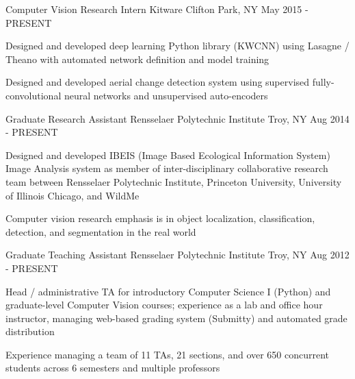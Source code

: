 

\begin{cventries}

  \cventry
    {Computer Vision Research Intern} %
    {Kitware} %
    {Clifton Park, NY} %
    {May 2015 - PRESENT} %
    {
      \begin{cvitems} %
        \item {Designed and developed deep learning Python library (KWCNN) using Lasagne / Theano with automated network definition and model training}
        \item {Designed and developed aerial change detection system using supervised fully-convolutional neural networks and unsupervised auto-encoders}
      \end{cvitems}
    }

\ifresume
\else
    \cventry
      {Graduate Research Assistant} %
      {Rensselaer Polytechnic Institute} %
      {Troy, NY} %
      {Aug 2014 - PRESENT} %
      {
        \begin{cvitems} %
          \item {Designed and developed IBEIS (Image Based Ecological Information System) Image Analysis system as member of inter-disciplinary collaborative research team between Rensselaer Polytechnic Institute, Princeton University, University of Illinois Chicago, and WildMe}
          \item {Computer vision research emphasis is in object localization, classification, detection, and segmentation in the real world}
        \end{cvitems}
      }
\fi

  \cventry
    {Graduate Teaching Assistant} %
    {Rensselaer Polytechnic Institute} %
    {Troy, NY} %
    {Aug 2012 - PRESENT} %
    {
      \begin{cvitems} %
        \item {Head / administrative TA for introductory Computer Science I (Python) and graduate-level Computer Vision courses; experience as a lab and office hour instructor, managing web-based grading system (Submitty) and automated grade distribution}
        \item {Experience managing a team of 11 TAs, 21 sections, and over 650 concurrent students across 6 semesters and multiple professors}
      \end{cvitems}
    }


\end{cventries}
